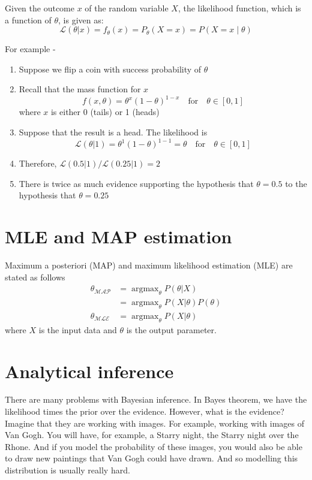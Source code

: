 \documentclass{book}
\DeclareMathOperator*{\argmax}{argmax}
\begin{document}
Given the outcome $x$ of the random variable $X$, the likelihood function, which is a function of $\theta$, is given as:
\begin{equation*}
\mathcal{L}(\theta|x) = f_{\theta}(x) = P_{\theta}(X = x) = P(X = x \mid \theta) 
\end{equation*} 

For example -
\begin{enumerate} \addtolength{\itemsep}{-0.5\baselineskip}
\item Suppose we flip a coin with success probability of $\theta$
\item Recall that the mass function for $x$
\[ f(x, \theta) = {\theta}^x{(1-\theta)^{1-x}} \quad \mbox{for} \quad \theta \in [0, 1]\] 
where $x$ is either 0 (tails) or 1 (heads)
\item Suppose that the result is a head. The likelihood is 
\[ \mathcal{L}(\theta|1) = {\theta}^1{(1-\theta)^{1-1}} = \theta \quad \mbox{for} \quad \theta \in [0, 1]\]
\item Therefore, $\mathcal{L}(0.5|1)/\mathcal{L}(0.25|1) = 2$
\item There is twice as much evidence supporting the hypothesis that $\theta = 0.5$ to the hypothesis that $\theta = 0.25$
\end{enumerate}

\section{MLE and MAP estimation}
Maximum a posteriori (MAP) and maximum likelihood estimation (MLE) are stated as follows
\begin{align*}
\theta_{\mathcal{MAP}} &= \argmax_{\theta} P(\theta|X) \nonumber \\
									&= \argmax_{\theta} P(X|\theta) P(\theta)  \nonumber \\
\theta_{\mathcal{MLE}} &= \argmax_{\theta} P(X|\theta) \nonumber
\end{align*}
where $X$ is the input data and $\theta$ is the output parameter.

\section{Analytical inference}
There are many problems with Bayesian inference. In Bayes theorem, we have the likelihood times the prior over the evidence. However, what is the evidence? Imagine that they are working with images. For example, working with images of Van Gogh. You will have, for example, a Starry night, the Starry night over the Rhone. And if you model the probability of these images, you would also be able to draw new paintings that Van Gogh could have drawn. And so modelling this distribution is usually really hard. 
\end{document}
